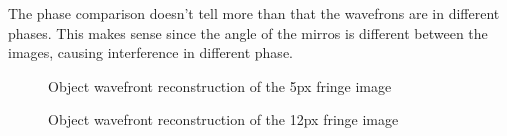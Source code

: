 \documentclass[12pt,a4paper,english
]{tunithesis}
\begin{document}
The phase comparison doesn't tell more than that the wavefrons are in different phases. This makes sense since the angle of the mirros is different between the images, causing interference in different phase.

\begin{figure}
  \centering
  \caption{Object wavefront reconstruction of the 5px fringe image}
   \label{fig:5px}
\end{figure}


\begin{figure}
  \centering
  \caption{Object wavefront reconstruction of the 12px fringe image}
    \label{fig:12px}
\end{figure}
\end{document}
